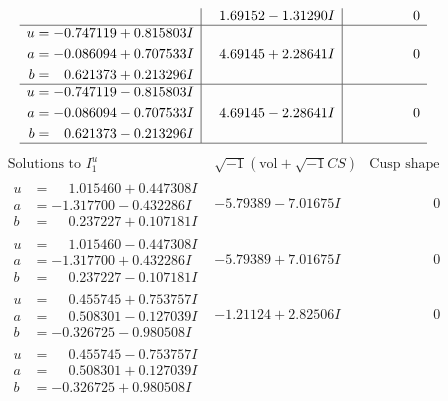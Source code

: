 \documentclass[1p]{elsarticle_modified}
\theoremstyle{definition}
\newcommand{\I}{\sqrt{-1}}
\begin{document}
$$\begin{array}{c|c|c}
 & \phantom{-}1.69152 - 1.31290 I & \phantom{-0.000000 } 0 \\ \hline\begin{aligned}
u &= -0.747119 + 0.815803 I \\
a &= -0.086094 + 0.707533 I \\
b &= \phantom{-}0.621373 + 0.213296 I\end{aligned}
 & \phantom{-}4.69145 + 2.28641 I & \phantom{-0.000000 } 0 \\ \hline\begin{aligned}
u &= -0.747119 - 0.815803 I \\
a &= -0.086094 - 0.707533 I \\
b &= \phantom{-}0.621373 - 0.213296 I\end{aligned}
 & \phantom{-}4.69145 - 2.28641 I & \phantom{-0.000000 } 0\\
 \hline 
 \end{array}$$\newpage$$\begin{array}{c|c|c}  
\text{Solutions to }I^u_{1}& \I (\text{vol} + \sqrt{-1}CS) & \text{Cusp shape}\\
 \hline 
\begin{aligned}
u &= \phantom{-}1.015460 + 0.447308 I \\
a &= -1.317700 - 0.432286 I \\
b &= \phantom{-}0.237227 + 0.107181 I\end{aligned}
 & -5.79389 - 7.01675 I & \phantom{-0.000000 } 0 \\ \hline\begin{aligned}
u &= \phantom{-}1.015460 - 0.447308 I \\
a &= -1.317700 + 0.432286 I \\
b &= \phantom{-}0.237227 - 0.107181 I\end{aligned}
 & -5.79389 + 7.01675 I & \phantom{-0.000000 } 0 \\ \hline\begin{aligned}
u &= \phantom{-}0.455745 + 0.753757 I \\
a &= \phantom{-}0.508301 - 0.127039 I \\
b &= -0.326725 - 0.980508 I\end{aligned}
 & -1.21124 + 2.82506 I & \phantom{-0.000000 } 0 \\ \hline\begin{aligned}
u &= \phantom{-}0.455745 - 0.753757 I \\
a &= \phantom{-}0.508301 + 0.127039 I \\
b &= -0.326725 + 0.980508 I\end{aligned}

\end{array}$$
\end{document}
